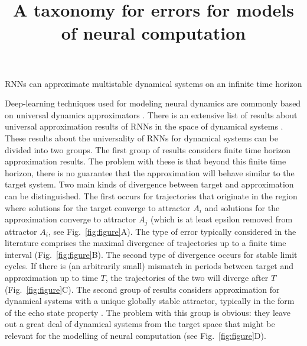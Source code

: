 \documentclass[10pt]{article}
\begin{document}

\title{A taxonomy for errors for models of neural computation}

\begin{center}
\Large{RNNs can approximate multistable dynamical systems on an infinite time horizon}
\end{center}

\noindent
Deep-learning techniques used for modeling neural dynamics are commonly based on universal dynamics approximators \citep{durstewitz2023reconstructing}.
There is an extensive list of results about universal approximation results of RNNs in the space of dynamical systems \citep{li2022approximation,jiang2023brief}.
These results about the universality of RNNs for dynamical systems can be divided into two groups.
 The first group of results considers finite time horizon approximation results.
  The problem with these is that beyond this finite time horizon, there is no guarantee that the approximation will behave similar to the target system.
   Two main kinds of divergence between target and approximation can be distinguished.
   The first occurs for trajectories that originate in the region where solutions for the target converge to attractor $A_i$ and solutions for the approximation converge to attractor $A_j$ (which is at least epsilon removed from attractor $A_i$, see Fig.~\ref{fig:figure}A). 
   The type of error typically considered in the literature comprises the maximal divergence of trajectories up to a finite time interval (Fig.~\ref{fig:figure}B).
   The second type of divergence occurs for stable limit cycles. If there is (an arbitrarily small) mismatch in periods between target and approximation up to time $T$, the trajectories of the two will diverge after $T$ (Fig.~\ref{fig:figure}C).
  The second group of results considers approximation for dynamical systems with a unique globally stable attractor, typically in the form of the echo state property \citep{jaeger2001echo}.
   The problem with this group is obvious: they leave out a great deal of dynamical systems from the target space that might be relevant for the modelling of neural computation \citep{wong2006timeintegration,mante2013context} (see Fig.~\ref{fig:figure}D).
\end{document}
